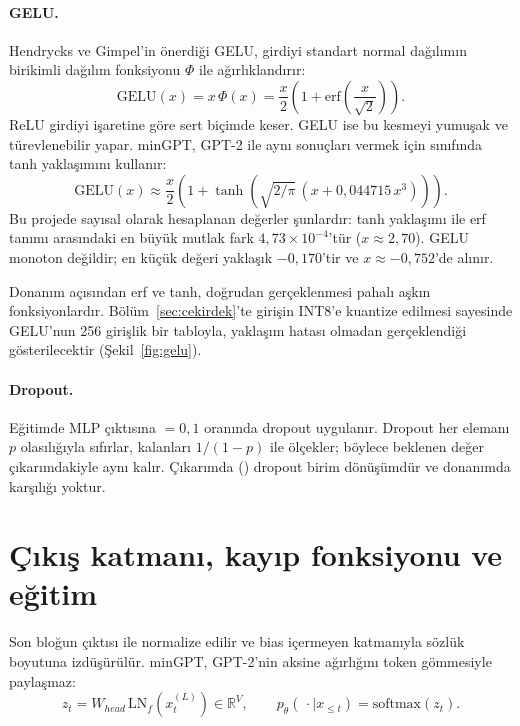 \paragraph{GELU.} Hendrycks ve Gimpel'in \cite{gelu} önerdiği GELU, girdiyi standart normal dağılımın birikimli dağılım fonksiyonu $\Phi$ ile ağırlıklandırır:
\begin{equation}
  \mathrm{GELU}(x) = x\,\Phi(x) = \frac{x}{2}\left(1 + \mathrm{erf}\!\left(\frac{x}{\sqrt{2}}\right)\right).
\end{equation}
ReLU girdiyi işaretine göre sert biçimde keser. GELU ise bu kesmeyi yumuşak ve türevlenebilir yapar. minGPT, GPT-2 ile aynı sonuçları vermek için  sınıfında tanh yaklaşımını kullanır:
\begin{equation}
  \mathrm{GELU}(x) \approx \frac{x}{2}\left(1 + \tanh\!\left(\sqrt{2/\pi}\,\left(x + 0{,}044715\,x^3\right)\right)\right).
\end{equation}
Bu projede sayısal olarak hesaplanan değerler şunlardır: tanh yaklaşımı ile erf tanımı arasındaki en büyük mutlak fark $4{,}73\times10^{-4}$'tür ($x\approx2{,}70$). GELU monoton değildir; en küçük değeri yaklaşık $-0{,}170$'tir ve $x\approx-0{,}752$'de alınır.

Donanım açısından erf ve tanh, doğrudan gerçeklenmesi pahalı aşkın fonksiyonlardır. Bölüm~\ref{sec:cekirdek}'te girişin INT8'e kuantize edilmesi sayesinde GELU'nun 256 girişlik bir tabloyla, yaklaşım hatası olmadan gerçeklendiği gösterilecektir (Şekil~\ref{fig:gelu}).

\paragraph{Dropout.} Eğitimde MLP çıktısına  $=0{,}1$ oranında dropout uygulanır. Dropout her elemanı $p$ olasılığıyla sıfırlar, kalanları $1/(1-p)$ ile ölçekler; böylece beklenen değer çıkarımdakiyle aynı kalır. Çıkarımda () dropout birim dönüşümdür ve donanımda karşılığı yoktur.

\section{Çıkış katmanı, kayıp fonksiyonu ve eğitim}

Son bloğun çıktısı  ile normalize edilir ve bias içermeyen  katmanıyla sözlük boyutuna izdüşürülür. minGPT, GPT-2'nin aksine  ağırlığını token gömmesiyle paylaşmaz:
\begin{equation}
  z_t = W_{head}\, \mathrm{LN}_f\!\left(x^{(L)}_t\right) \in \mathbb{R}^{V}, \qquad p_\theta(\,\cdot \mid x_{\le t}) = \mathrm{softmax}(z_t).
\end{equation}

